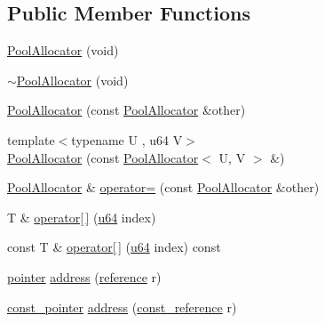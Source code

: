 \subsection*{Public Member Functions}
\begin{DoxyCompactItemize}
\item 
\hyperlink{classcrap_1_1memory_1_1_pool_allocator_a0745a10399c2c47ba3edd0b59afa353f}{Pool\-Allocator} (void)
\item 
\hyperlink{classcrap_1_1memory_1_1_pool_allocator_abf51a07f986a6c72095c48b3399d6bb6}{$\sim$\-Pool\-Allocator} (void)
\item 
\hyperlink{classcrap_1_1memory_1_1_pool_allocator_a28ad76caa8a348f4db57c97f2e1727dc}{Pool\-Allocator} (const \hyperlink{classcrap_1_1memory_1_1_pool_allocator}{Pool\-Allocator} \&other)
\item 
{\footnotesize template$<$typename U , u64 V$>$ }\\\hyperlink{classcrap_1_1memory_1_1_pool_allocator_a60b2bfe7e4556c2bbf18b187d7fbc325}{Pool\-Allocator} (const \hyperlink{classcrap_1_1memory_1_1_pool_allocator}{Pool\-Allocator}$<$ U, V $>$ \&)
\item 
\hyperlink{classcrap_1_1memory_1_1_pool_allocator}{Pool\-Allocator} \& \hyperlink{classcrap_1_1memory_1_1_pool_allocator_af1bbbd167bfb43e718b41b2101c9f69d}{operator=} (const \hyperlink{classcrap_1_1memory_1_1_pool_allocator}{Pool\-Allocator} \&other)
\item 
T \& \hyperlink{classcrap_1_1memory_1_1_pool_allocator_a1c6e7efd4f6448a830785533294afaf9}{operator\mbox{[}$\,$\mbox{]}} (\hyperlink{types_8h_a3f7e2bcbb0b4c338f3c4f6c937cd4234}{u64} index)
\item 
const T \& \hyperlink{classcrap_1_1memory_1_1_pool_allocator_a3b4da546a97b5afbd3b8dc84a615206f}{operator\mbox{[}$\,$\mbox{]}} (\hyperlink{types_8h_a3f7e2bcbb0b4c338f3c4f6c937cd4234}{u64} index) const 
\item 
\hyperlink{classcrap_1_1memory_1_1_pool_allocator_a4de0cc524be4b7f4fd16c1ac54383c71}{pointer} \hyperlink{classcrap_1_1memory_1_1_pool_allocator_adf421f81fa32a4fa48526a060a4cd24f}{address} (\hyperlink{classcrap_1_1memory_1_1_pool_allocator_a0040a8887356f723907ec1dac0a88fe8}{reference} r)
\item 
\hyperlink{classcrap_1_1memory_1_1_pool_allocator_afb622f1279d38037c15d9d4edfcf8b73}{const\-\_\-pointer} \hyperlink{classcrap_1_1memory_1_1_pool_allocator_a78d959d2d6d8c56642031a8a4f2c8439}{address} (\hyperlink{classcrap_1_1memory_1_1_pool_allocator_ad3705c8900e2a4bff380986d92ae6f7e}{const\-\_\-reference} r)

\end{DoxyCompactItemize}
